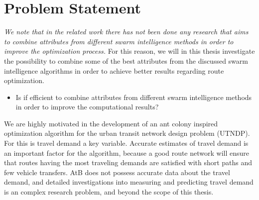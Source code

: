 \section{Problem Statement} 

\textit{We note that in the related work there has not been done any research that aims to combine attributes from different swarm intelligence methods in order to improve the optimization process.} For this reason, we will in this thesis investigate the possibility to combine some of the best attributes from the discussed swarm intelligence algorithms in order to achieve better results regarding route optimization. 
\begin{itemize}
\item Is if efficient to combine attributes from different swarm intelligence methods in order to improve the computational results?
\end{itemize}

We are highly motivated in the development of an ant colony inspired optimization algorithm for the urban transit network design problem (UTNDP). For this is travel demand a key variable. Accurate estimates of travel demand is an important factor for the algorithm, because a good route network will ensure that routes having the most traveling demands are satisfied with short paths and few vehicle transfers. AtB does not possess accurate data about the travel demand, and detailed investigations into measuring and predicting travel demand is an complex research problem, and beyond the scope of this thesis. 

